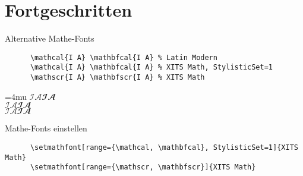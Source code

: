 \section{Fortgeschritten}





\begin{frame}[fragile]{Alternative Mathe-Fonts}
  \begin{CodeExample}{0.83}
    \begin{lstlisting}
      \mathcal{I A} \mathbfcal{I A} % Latin Modern
      \mathcal{I A} \mathbfcal{I A} % XITS Math, StylisticSet=1
      \mathscr{I A} \mathbfscr{I A} % XITS Math
    \end{lstlisting}
  \CodeResult
    \Umathordordspacing\textstyle=4mu
    $\mathcal{I A} \mathbfcal{I A}$ \\
    { $\mathcal{I A} \mathbfcal{I A}$} \\
    $\mathscr{I A} \mathbfscr{I A}$
  \end{CodeExample}

  \begin{block}{Mathe-Fonts einstellen}
    \begin{lstlisting}
      \setmathfont[range={\mathcal, \mathbfcal}, StylisticSet=1]{XITS Math}
      \setmathfont[range={\mathscr, \mathbfscr}]{XITS Math}
    \end{lstlisting}
  \end{block}
\end{frame}
